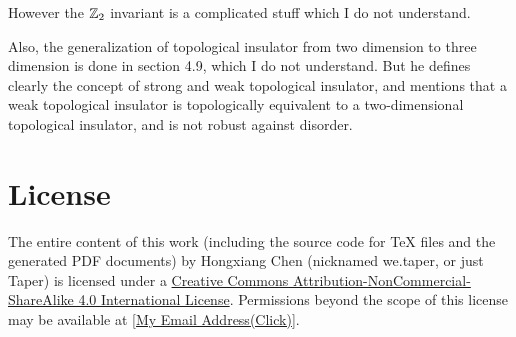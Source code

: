 \documentclass{article}
\begin{document}
However the $\mathbb{Z}_2$ invariant is a complicated stuff which I do not understand.

Also, the generalization of topological insulator from two dimension to three
dimension is done in section 4.9, which I do not understand. But he defines
clearly the concept of strong and weak topological insulator, and mentions that
a weak topological insulator is topologically equivalent to a two-dimensional
topological insulator, and is not robust against disorder.

{}


\printnomenclature
\section{License}
The entire content of this work (including the source code
for TeX files and the generated PDF documents) by 
Hongxiang Chen (nicknamed we.taper, or just Taper) is
licensed under a 
\href{http://creativecommons.org/licenses/by-nc-sa/4.0/}{Creative 
Commons Attribution-NonCommercial-ShareAlike 4.0 International 
License}. Permissions beyond the scope of this 
license may be available at 
\href{http://www.google.com/recaptcha/mailhide/d?k=015LguzBJigi0rpyuJRqLoig==\&c=p1c-M-mm7ZcjUCkTuZZa9eEPHRVk6paN0694iazlQy8=}
{[My Email Address(Click)]}.
\end{document}
